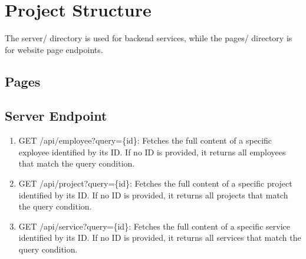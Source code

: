 \section{Project Structure}
The server/ directory is used for backend services, while the pages/ directory is for website page endpoints.
\subsection{Pages}
\subsection{Server Endpoint}
\begin{enumerate}
	\item GET /api/employee?query=\{id\}: Fetches the full content of a specific exployee identified by its ID. If no ID is provided, it returns all employees that match the query condition.
	\item GET /api/project?query=\{id\}: Fetches the full content of a specific project identified by its ID. If no ID is provided, it returns all projects that match the query condition.
	\item GET /api/service?query=\{id\}: Fetches the full content of a specific service identified by its ID. If no ID is provided, it returns all services that match the query condition.
\end{enumerate}
